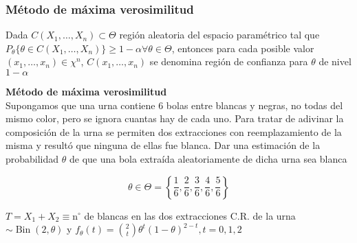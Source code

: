 


\subsubsection{Método de máxima verosimilitud}

\begin{definición}
  Dada $C(X_1, \ldots, X_n) \subset \Theta$ región aleatoria del espacio paramétrico tal que $P_{\theta}\{\theta \in C(X_1, \ldots, X_n)\} \geq 1 - \alpha \forall \theta \in \Theta$, entonces para cada posible valor $(x_1, \ldots, x_n) \in \chi^n$, $C(x_1, \ldots, x_n)$ se denomina región de confianza para $\theta$ de nivel $1 - \alpha$
\end{definición}

\textbf{Método de máxima verosimilitud}\\
Supongamos que una urna contiene 6 bolas entre blancas y negras, no todas del mismo color, pero se ignora cuantas hay de cada uno. Para tratar de adivinar la composición de la urna se permiten dos extracciones con reemplazamiento de la misma y resultó que ninguna de ellas fue blanca. Dar una estimación de la probabilidad $\theta$ de que una bola extraída aleatoriamente de dicha urna sea blanca

$$
  \theta \in \Theta=\left\{\frac{1}{6}, \frac{2}{6}, \frac{3}{6}, \frac{4}{6}, \frac{5}{6}\right\}
$$

$T=X_{1}+X_{2} \equiv \mathrm{n}^{\circ}$ de blancas en las dos extracciones C.R. de la urna $\sim \operatorname{Bin}(2, \theta)$ y $f_{\theta}(t)=\binom{2}{t} \theta^{t}(1-\theta)^{2-t}, t=0,1,2$

